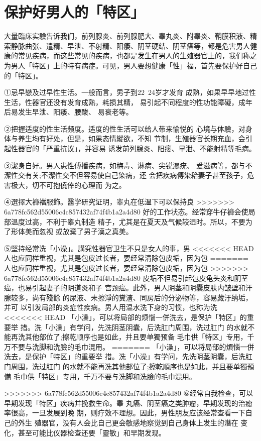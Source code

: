 \documentclass[12pt,UTF8]{ctexbook}
\begin{document}
\section{保护好男人的「特区」}

大量臨床实驗告诉我们，前列腺炎、前列腺肥大、睾丸炎、附睾炎、鞘膜积液、精索静脉曲张、遣精、早泄、不射精、阳痿、阴茎硬结、阴茎癌等，都是危害男人健康的常见疾病，而这些常见的疾病，也都是发生在男人的生殖器官上的，我们称之为男人「特区」上的特有病症。可见，男人要想健康「性」福，首先要保护好自己的「特区」。

①忌早戀及过早性生活。一般而言，男子到22~24岁才发育
成熟，如果早早地过性生活，性器官还没有发育成熟，耗损其精，
易引起不同程度的性功能障礙，成年后易发生早泄、阳痿、腰酸、
易衰老等。

②把握适度的性生活频度。适度的性生活可以给人带来愉悦的
心境与体驗，对身体与养生均有好处，但是，如果态情縱欲，不知
节制，生殖器官长期充血，会引起性器官的「严重抗议」，并容易
诱发前列腺炎、阳痿、早泄、不能射精等毛病。

③潔身自好。男人患性傅播疾病，如梅毒、淋病、尖锐濕疣、
爱滋病等，都与不潔性交有关;不潔性交不但容易使自己染病，还
会把疾病傅染耠妻子甚至孩子，危害极大，切不可抱僥倖的心理而
为之。

④選擇大褲襠服飾。醫学研究证明，睾丸在低温下可以保持良
>>>>>>> 6a778fc562d55006c4c857432af74f4b1a2a4d80
好的工作状态。经常穿牛仔褲会使局部温度过高，不利于睾丸制造
精子，尤其是在夏天及气候较湿时。所以，不要为了形体美而忽视
或放棄了男子漢之真美。

⑤堅持经常洗「小澡」。講究性器官卫生不只是女人的事，男
<<<<<<< HEAD
人也应同样重视，尤其是包皮过长者，要经常清除包皮垢，因为包
=======
人也应同样重视，尤其是包皮过长者，要经常清除包皮垢，因为包
>>>>>>> 6a778fc562d55006c4c857432af74f4b1a2a4d80
皮垢不但易引起包皮龟头炎和阴茎癌，也易引起妻子的阴道炎和子
宫颈癌。此外，男人阴茎和阴囊皮肤内皱壁和汗腺较多，尚有殘餘
的尿液、未擦淨的糞渣、同房后的分泌物等，容易藏汙纳垢，并可
以引发局部的炎症性疾病。男人用温水洗下身的习惯，也称为洗
<<<<<<< HEAD
「小澡」，可以将局部的烦惱一併洗去，是保护「特区」的重要举
措。洗「小澡」有学问，先洗阴茎阴囊，后洗肛门周围，洗过肛门
的水就不能再洗其他部位了;擦乾顺序也是如此，并且要单獨预备
毛巾供「特区」专用，千万不要与洗脚和洗臉的毛巾混用。
=======
「小澡」，可以将局部的煩惱一併洗去，是保护「特区」的重要举
措。洗「小澡」有学问，先洗阴茎阴囊，后洗肛门周围，洗过肛门
的水就不能再洗其他部位了;擦乾順序也是如此，并且要单獨預備
毛巾供「特区」专用，千万不要与洗脚和洗臉的毛巾混用。

>>>>>>> 6a778fc562d55006c4c857432af74f4b1a2a4d80
⑥经常自我检查，可以早期发现「特区」疾病并挽救生命。睾
丸癌、阴茎癌之类肿瘤，早期发现的治癒率很高，一旦发展到晚
期，则疗效不理想。因此，男性朋友应该经常查看一下自己的外生
殖器官，没有人会比自己更会敏感地察觉到自己身体上发生的潛在
变化，甚至可能比仪器检查还要「靈敏」和早期发现。
\end{document}
